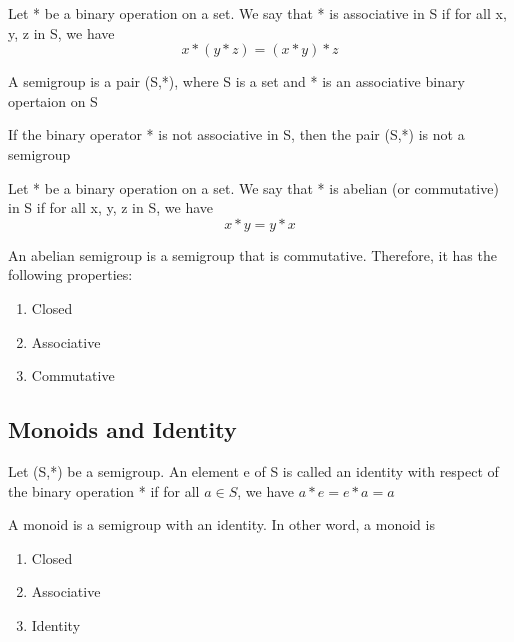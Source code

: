 \documentclass{article}
\begin{document}
\begin{definition}[Associativity]
    Let * be a binary operation on a set. We say that * is associative in S if
    for all x, y, z in S, we have
    $$ x * (y * z) = (x * y) * z $$
\end{definition}


\begin{definition}[Semigroup]
    A semigroup is a pair (S,*), where S is a set and * is an associative binary
    opertaion on S
\end{definition}

\begin{corollary}
    If the binary operator * is not associative in S, then the pair (S,*) is not
    a semigroup
\end{corollary}

\begin{definition}
    Let * be a binary operation on a set. We say that * is abelian (or commutative)
    in S if for all x, y, z in S, we have
    $$ x * y = y * x $$
\end{definition}

\begin{definition}
    An abelian semigroup is a semigroup that is commutative. Therefore, it has the
    following properties:
    \begin{enumerate}
	\item Closed
	\item Associative
	\item Commutative
    \end{enumerate}
\end{definition}

\subsection{Monoids and Identity}

\begin{definition}[Identity]
    Let (S,*) be a semigroup. An element e of S is called an identity with respect
    of the binary operation * if for all \( a \in S \), we have \( a * e = e * a = a \)
\end{definition}

\begin{definition}[Monoid]
    A monoid is a semigroup with an identity. In other word, a monoid is
    \begin{enumerate}
	\item Closed
	\item Associative
	\item Identity
    \end{enumerate}
\end{definition}
\end{document}
